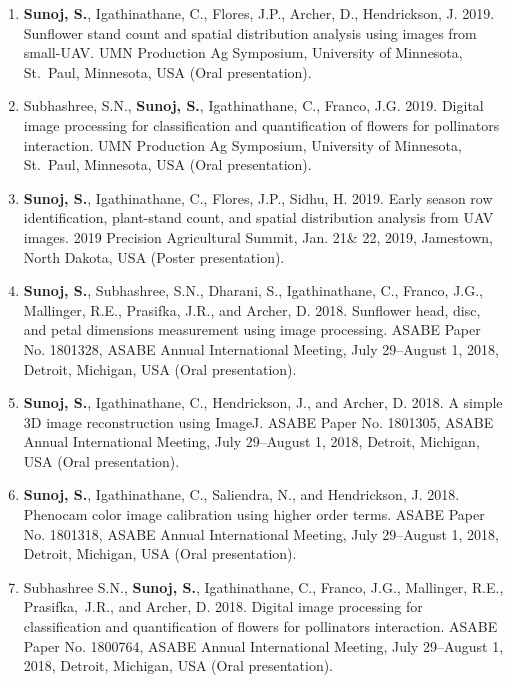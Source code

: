\documentclass[11pt]{article}
\begin{document}
\begin{enumerate}[itemsep=-2pt]
\item \textbf{Sunoj, S.}, Igathinathane, C., Flores, J.P., Archer, D., Hendrickson, J. 2019. Sunflower stand count and spatial distribution analysis using images from small-UAV. UMN Production Ag Symposium, University of Minnesota, St.~Paul, Minnesota, USA (Oral presentation).

\item Subhashree, S.N., \textbf{Sunoj, S.}, Igathinathane, C., Franco, J.G. 2019. Digital image processing for classification and quantification of flowers for pollinators interaction. UMN Production Ag Symposium, University of Minnesota, St.~Paul, Minnesota, USA (Oral presentation).

\item \textbf{Sunoj, S.}, Igathinathane, C., Flores, J.P., Sidhu, H. 2019. Early season row identification, plant-stand count, and spatial distribution analysis from UAV images. 2019 Precision Agricultural Summit, Jan. 21\& 22, 2019, Jamestown, North Dakota, USA (Poster presentation).

\item \textbf{Sunoj, S.}, Subhashree, S.N., Dharani, S., Igathinathane, C., Franco, J.G., Mallinger, R.E., Prasifka, J.R., and Archer, D.  2018. Sunflower head, disc, and petal dimensions measurement using image processing. ASABE Paper No. 1801328, ASABE Annual International Meeting, July 29--August 1, 2018, Detroit, Michigan, USA (Oral presentation).

\item \textbf{Sunoj, S.}, Igathinathane, C., Hendrickson, J., and Archer, D. 2018. A simple 3D image reconstruction using ImageJ. ASABE Paper No. 1801305, ASABE Annual International Meeting, July 29--August 1, 2018, Detroit, Michigan, USA (Oral presentation).

\item \textbf{Sunoj, S.}, Igathinathane, C., Saliendra, N., and Hendrickson, J. 2018. Phenocam color image calibration using higher order terms. ASABE Paper No. 1801318, ASABE Annual International Meeting, July 29--August 1, 2018, Detroit, Michigan, USA (Oral presentation).

\item Subhashree S.N., \textbf{Sunoj, S.}, Igathinathane, C., Franco, J.G., Mallinger, R.E., Prasifka,~J.R., and Archer, D. 2018. Digital image processing for classification and quantification of flowers for pollinators interaction. ASABE Paper No. 1800764, ASABE Annual International Meeting, July 29--August 1, 2018, Detroit, Michigan, USA (Oral presentation).


\end{enumerate}
\end{document}
